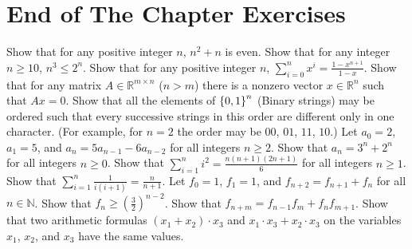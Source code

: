 \section*{End of The Chapter Exercises}
\begin{exercises}
  \exerciseitem Show that for any positive integer $n$, $n^2 + n$ is even.
  \exerciseitem Show that for any integer $n \ge 10$,
    $n^3 \le 2^n$.
  \exerciseitem Show that for any positive integer $n$,
    $\sum_{i = 0}^n x^i = \frac{1 - x^{n + 1}}{1 - x}$.
  \exerciseitem Show that for any matrix $A \in \mathbb{R}^{m \times n}$
    ($n > m$) there is a nonzero vector $x \in \mathbb{R}^n$ such that $Ax = 0$.
  \exerciseitem  Show that all the elements of $\set{0, 1}^n$ (Binary strings)
    may be ordered such that every successive strings in this order are
    different only in one character.
    (For example, for $n = 2$ the order may be $00$, $01$, $11$, $10$.)
  \exerciseitem Let $a_0 = 2$, $a_1 = 5$, and $a_n = 5a_{n - 1} - 6 a_{n - 2}$
    for all integers $n \ge 2$. Show that $a_n = 3^n + 2^n$ for all integers
    $n \ge 0$.
  \exerciseitem Show that $\sum_{i = 1}^n i^2 = \frac{n (n + 1)(2n + 1)}{6}$
    for all integers $n \ge 1$.
  \exerciseitem Show that $\sum\limits_{i = 1}^n \frac{1}{i (i + 1)} =
    \frac{n}{n + 1}$.
  \exerciseitem Let $f_0 = 1$, $f_1 = 1$, and $f_{n + 2} = f_{n + 1} + f_n$ for
    all $n \in \mathbb{N}$. Show that
    $f_n \ge \left(\frac{3}{2}\right)^{n - 2}$.
  \exerciseitem Show that $f_{n + m} = f_{n - 1} f_m + f_n f_{m + 1}$.
  \exerciseitem Show that two arithmetic formulas $(x_1 + x_2) \cdot x_3$ and
    $x_1 \cdot x_3 + x_2 \cdot x_3$ on the variables $x_1$, $x_2$, and $x_3$
    have the same values.
\end{exercises}
